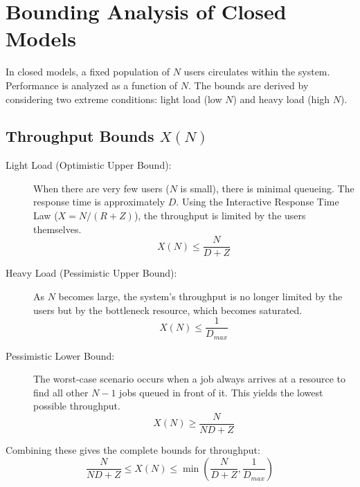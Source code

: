 
\section{Bounding Analysis of Closed Models}
In closed models, a fixed population of $N$ users circulates within the system. Performance is analyzed as a function of $N$. The bounds are derived by considering two extreme conditions: light load (low $N$) and heavy load (high $N$).

\subsection{Throughput Bounds $X(N)$}
\begin{description}
    \item[Light Load (Optimistic Upper Bound):] When there are very few users ($N$ is small), there is minimal queueing. The response time is approximately $D$. Using the Interactive Response Time Law ($X = N/(R+Z)$), the throughput is limited by the users themselves.
    \begin{equation*}
        X(N) \le \frac{N}{D+Z}
    \end{equation*}
    \item[Heavy Load (Pessimistic Upper Bound):] As $N$ becomes large, the system's throughput is no longer limited by the users but by the bottleneck resource, which becomes saturated.
    \begin{equation*}
        X(N) \le \frac{1}{D_{max}}
    \end{equation*}
    \item[Pessimistic Lower Bound:] The worst-case scenario occurs when a job always arrives at a resource to find all other $N-1$ jobs queued in front of it. This yields the lowest possible throughput.
    \begin{equation*}
         X(N) \ge \frac{N}{ND + Z}
    \end{equation*}
\end{description}
Combining these gives the complete bounds for throughput:
\begin{equation}
    \frac{N}{ND + Z} \le X(N) \le \min \left( \frac{N}{D + Z}, \frac{1}{D_{max}} \right)
\end{equation}

